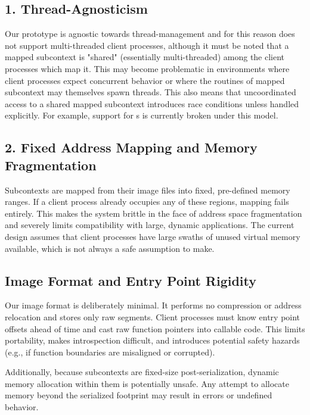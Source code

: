 \subsection*{1. Thread-Agnosticism}
Our prototype is agnostic towards thread-management and for this reason does not support multi-threaded client processes, although it must be noted that a mapped subcontext is "shared" (essentially multi-threaded) among the client processes which map it. This may become problematic in environments where client processes expect concurrent behavior or where the routines of mapped subcontext may themselves spawn threads. This also means that uncoordinated access to a shared mapped subcontext introduces race conditions unless handled explicitly. For example, support for s is currently broken under this model.

\subsection*{2. Fixed Address Mapping and Memory Fragmentation}
Subcontexts are mapped from their image files into fixed, pre-defined memory ranges. If a client process already occupies any of these regions, mapping fails entirely. This makes the system brittle in the face of address space fragmentation and severely limits compatibility with large, dynamic applications. The current design assumes that client processes have large swaths of unused virtual memory available, which is not always a safe assumption to make.

\subsection*{Image Format and Entry Point Rigidity}
Our image format is deliberately minimal. It performs no compression or address relocation and stores only raw segments. Client processes must know entry point offsets ahead of time and cast raw function pointers into callable code. This limits portability, makes introspection difficult, and introduces potential safety hazards (e.g., if function boundaries are misaligned or corrupted).

Additionally, because subcontexts are fixed-size post-serialization, dynamic memory allocation within them is potentially unsafe. Any attempt to allocate memory beyond the serialized footprint may result in errors or undefined behavior.

